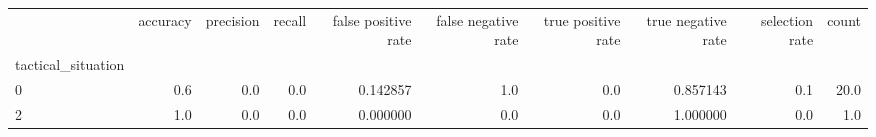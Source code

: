 \begin{tabular}{lrrrrrrrrr}
\toprule
{} &  accuracy &  precision &  recall &  false positive rate &  false negative rate &  true positive rate &  true negative rate &  selection rate &  count \\
tactical\_situation &           &            &         &                      &                      &                     &                     &                 &        \\
\midrule
0                  &       0.6 &        0.0 &     0.0 &             0.142857 &                  1.0 &                 0.0 &            0.857143 &             0.1 &   20.0 \\
2                  &       1.0 &        0.0 &     0.0 &             0.000000 &                  0.0 &                 0.0 &            1.000000 &             0.0 &    1.0 \\
\bottomrule
\end{tabular}
